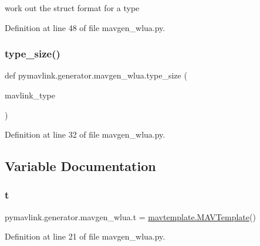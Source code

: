 \begin{DoxyVerb}work out the struct format for a type\end{DoxyVerb}
 

Definition at line 48 of file mavgen\+\_\+wlua.\+py.

\mbox{\label{namespacepymavlink_1_1generator_1_1mavgen__wlua_aaced6c6a179f60dbd142ca923718ab12}} 
\subsubsection{\texorpdfstring{type\_size()}{type\_size()}}
{\footnotesize\ttfamily def pymavlink.\+generator.\+mavgen\+\_\+wlua.\+type\+\_\+size (\begin{DoxyParamCaption}\item[{}]{mavlink\+\_\+type }\end{DoxyParamCaption})}



Definition at line 32 of file mavgen\+\_\+wlua.\+py.



\subsection{Variable Documentation}
\mbox{\label{namespacepymavlink_1_1generator_1_1mavgen__wlua_a8aa3596ee3c13af1cad0b541f7a51808}} 
\subsubsection{\texorpdfstring{t}{t}}
{\footnotesize\ttfamily pymavlink.\+generator.\+mavgen\+\_\+wlua.\+t = \mbox{\hyperlink{classpymavlink_1_1generator_1_1mavtemplate_1_1MAVTemplate}{mavtemplate.\+M\+A\+V\+Template}}()}



Definition at line 21 of file mavgen\+\_\+wlua.\+py.

